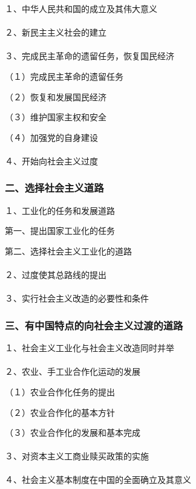 \documentclass{ctexart}
\begin{document}
１、中华人民共和国的成立及其伟大意义
\\\\

２、新民主主义社会的建立
\\\\

３、完成民主革命的遗留任务，恢复国民经济

（１）完成民主革命的遗留任务

（２）恢复和发展国民经济

（３）维护国家主权和安全

（４）加强党的自身建设
\\\\

４、开始向社会主义过度

\subsubsection{二、选择社会主义道路}
１、工业化的任务和发展道路

第一、提出国家工业化的任务

第二、选择社会主义工业化的道路
\\\\

２、过度使其总路线的提出
\\\\

３、实行社会主义改造的必要性和条件

\subsubsection{三、有中国特点的向社会主义过渡的道路}

１、社会主义工业化与社会主义改造同时并举
\\\\

２、农业、手工业合作化运动的发展

（１）农业合作化任务的提出

（２）农业合作化的基本方针

（３）农业合作化的发展和基本完成
\\\\

３、对资本主义工商业赎买政策的实施
\\\\

４、社会主义基本制度在中国的全面确立及其意义
\end{document}
